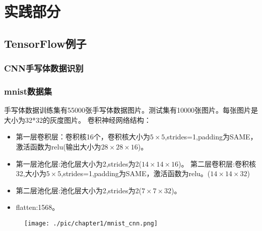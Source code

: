 \chapter{实践部分}
\section{TensorFlow例子}
\subsection{CNN手写体数据识别}
\subsection{mnist数据集}
手写体数据训练集有55000张手写体数据图片。测试集有10000张图片。每张图片是大小为32*32的灰度图片。
卷积神经网络结构：
\begin{itemize}
	\item 第一层卷积层：卷积核16个，卷积核大小为$5\times5$,strides=1,padding为SAME，激活函数为relu(输出大小为$28\times28\times16$)。
	\item 第一层池化层:池化层大小为2,strides为2($14\times14\times16$)。
第二层卷积层:卷积核32,大小为$5\times5$,strides=1,padding为SAME，激活函数为relu。($14\times14\times32$)
	\item 第二层池化层:池化层大小为2,strides为2($7\times7\times32$)。
	\item flatten:1568。
\end{itemize}
\begin{figure}[H]
	\texttt{[image: ./pic/chapter1/mnist\_cnn.png]}
\end{figure}
